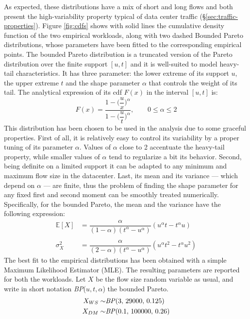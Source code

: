 As expected, these distributions have a mix of short and long flows and both present the high-variability property typical of data center traffic (\S \ref{sec:traffic-properties}). Figure \ref{fig:cdfs} shows with solid lines the cumulative density function of the two empirical workloads, along with two dashed Bounded Pareto distributions, whose parameters have been fitted to the corresponding empirical points. The bounded Pareto distribution is a truncated version of the Pareto distribution over the finite support $[u,t]$ and it is well-suited to model heavy-tail characteristics. It has three parameter: the lower extreme of its support $u$, the upper extreme $t$ and the shape parameter $\alpha$ that controls the weight of its tail. The analytical expression of its cdf $F(x)$ in the interval $[u,t]$ is:
\begin{equation}
	F(x) = \dfrac{1-\Big(\dfrac{u}{x}\Big)^{\alpha}}{1-\Big(\dfrac{u}{t}\Big)^{\alpha}}, \qquad 0 \le \alpha \le 2
\end{equation}
This distribution has been chosen to be used in the analysis due to some graceful properties. First of all, it is relatively easy to control its variability by a proper tuning of its parameter $\alpha$. Values of $\alpha$ close to 2 accentuate the heavy-tail property, while smaller values of $\alpha$ tend to regularize a bit its behavior. Second, being definite on a limited support it can be adapted to any minimum and maximum flow size in the datacenter. Last, its mean and its variance  --- which depend on $\alpha$ --- are finite, thus the problem of finding the shape parameter for any fixed first and second moment can be smoothly treated numerically. Specifically, for the bounded Pareto, the mean and the variance have the following expression:
\begin{align*}
\mathbb{E}[X] &= \dfrac{\alpha}{(1-\alpha)(t^{\alpha}-u^{\alpha})} (u^{\alpha}t - t^{\alpha}u) \\ \\
\sigma_X^2 &= \dfrac{\alpha}{(2-\alpha)(t^{\alpha}-u^{\alpha})} (u^{\alpha}t^2 - t^{\alpha}u^2)
\end{align*}
The best fit to the empirical distributions has been obtained with a simple Maximum Likelihood Estimator (MLE). The resulting parameters are reported for both the workloads. Let $X$ be the flow size random variable as usual, and write in short notation \textit{BP}($u,t,\alpha$) the bounded Pareto. 
\begin{align*}
	X_{WS} \sim& \text{\textit{BP}}(3, \, 29000, \, 0.125)\\
	X_{DM} \sim& \text{\textit{BP}}(0.1, \, 100000, \,0.26)
\end{align*}

